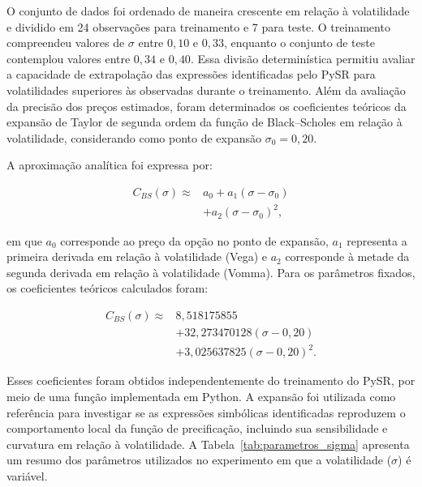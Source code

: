 O conjunto de dados foi ordenado de maneira
crescente em relação à volatilidade e dividido
em 24 observações para treinamento e 7 para
teste. O treinamento compreendeu valores de
$\sigma$ entre $0{,}10$ e $0{,}33$, enquanto
o conjunto de teste contemplou valores entre
$0{,}34$ e $0{,}40$. Essa divisão determinística
permitiu avaliar a capacidade de extrapolação
das expressões identificadas pelo PySR para
volatilidades superiores às observadas durante
o treinamento. Além da avaliação da precisão dos preços
estimados, foram determinados os coeficientes
teóricos da expansão de Taylor de segunda
ordem da função de Black--Scholes em relação
à volatilidade, considerando como ponto de
expansão $\sigma_0=0{,}20$.

A aproximação analítica foi expressa por:

\begin{equation}
\begin{aligned}
C_{BS}(\sigma) \approx {}&
a_0+a_1(\sigma-\sigma_0)\\
&+a_2(\sigma-\sigma_0)^2,
\end{aligned}
\end{equation}

em que $a_0$ corresponde ao preço da opção
no ponto de expansão, $a_1$ representa
a primeira derivada em relação à volatilidade
(Vega) e $a_2$ corresponde à metade da
segunda derivada em relação à volatilidade
(Vomma).
Para os parâmetros fixados, os coeficientes
teóricos calculados foram:

\begin{equation}
\begin{aligned}
C_{BS}(\sigma) \approx {}&
8{,}518175855\\
&+32{,}273470128(\sigma-0{,}20)\\
&+3{,}025637825(\sigma-0{,}20)^2.
\end{aligned}
\end{equation}

Esses coeficientes foram obtidos
independentemente do treinamento do PySR,
por meio de uma função implementada em Python.
A expansão foi utilizada como referência
para investigar se as expressões simbólicas
identificadas reproduzem o comportamento
local da função de precificação, incluindo
sua sensibilidade e curvatura em relação
à volatilidade. A Tabela~\ref{tab:parametros_sigma} apresenta um resumo
dos parâmetros utilizados no experimento em que
a volatilidade ($\sigma$) é variável.


